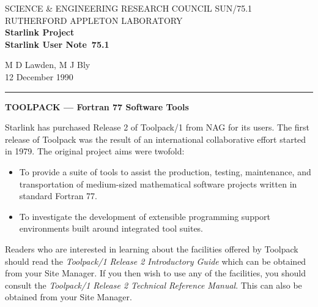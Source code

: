 \pagestyle{myheadings}

\newcommand{\stardoccategory}  {Starlink User Note}
\newcommand{\stardocinitials}  {SUN}
\newcommand{\stardocnumber}    {75.1}
\newcommand{\stardocauthors}   {M D Lawden, M J Bly}
\newcommand{\stardocdate}      {12 December 1990}
\newcommand{\stardoctitle}     {TOOLPACK --- Fortran 77 Software Tools}

\newcommand{\stardocname}{\stardocinitials /\stardocnumber}
\renewcommand{\_}{{\tt\char'137}}     %
\markright{\stardocname}
\setlength{\textwidth}{160mm}
\setlength{\textheight}{240mm}
\setlength{\topmargin}{-5mm}
\setlength{\oddsidemargin}{0mm}
\setlength{\evensidemargin}{0mm}
\setlength{\parindent}{0mm}
\setlength{\parskip}{\medskipamount}
\setlength{\unitlength}{1mm}


\thispagestyle{empty}
SCIENCE \& ENGINEERING RESEARCH COUNCIL \hfill \stardocname\\
RUTHERFORD APPLETON LABORATORY\\
{\large\bf Starlink Project\\}
{\large\bf \stardoccategory\ \stardocnumber}
\begin{flushright}
\stardocauthors\\
\stardocdate
\end{flushright}
\vspace{-4mm}
\rule{\textwidth}{0.5mm}
\vspace{5mm}
\begin{center}
{\Large\bf \stardoctitle}
\end{center}
\vspace{5mm}

Starlink has purchased Release 2 of Toolpack/1 from NAG for its users.
The first release of Toolpack was the result of an international collaborative
effort started in 1979.
The original project aims were twofold:
\begin{itemize}
\item To provide a suite of tools to assist the production, testing,
maintenance, and transportation of medium-sized mathematical software projects
written in standard Fortran 77.
\item To investigate the development of extensible programming support
environments built around integrated tool suites.
\end{itemize}
Readers who are interested in learning about the facilities offered by
Toolpack should read the {\em Toolpack/1 Release 2 Introductory Guide} which
can be obtained from your Site Manager.
If you then wish to use any of the facilities, you should consult the
{\em Toolpack/1 Release 2 Technical Reference Manual}.
This can also be obtained from your Site Manager.

